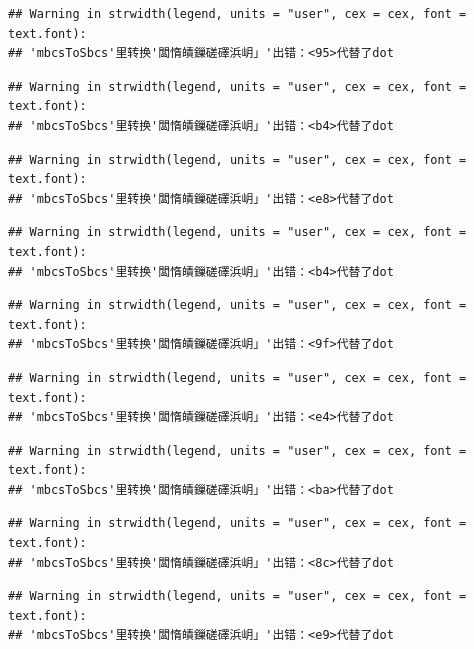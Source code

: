 \documentclass[
]{book}
\begin{document}
\begin{verbatim}
## Warning in strwidth(legend, units = "user", cex = cex, font = text.font):
## 'mbcsToSbcs'里转换'闆惰皟鏁磋礋浜岄」'出错：<95>代替了dot
\end{verbatim}

\begin{verbatim}
## Warning in strwidth(legend, units = "user", cex = cex, font = text.font):
## 'mbcsToSbcs'里转换'闆惰皟鏁磋礋浜岄」'出错：<b4>代替了dot
\end{verbatim}

\begin{verbatim}
## Warning in strwidth(legend, units = "user", cex = cex, font = text.font):
## 'mbcsToSbcs'里转换'闆惰皟鏁磋礋浜岄」'出错：<e8>代替了dot
\end{verbatim}

\begin{verbatim}
## Warning in strwidth(legend, units = "user", cex = cex, font = text.font):
## 'mbcsToSbcs'里转换'闆惰皟鏁磋礋浜岄」'出错：<b4>代替了dot
\end{verbatim}

\begin{verbatim}
## Warning in strwidth(legend, units = "user", cex = cex, font = text.font):
## 'mbcsToSbcs'里转换'闆惰皟鏁磋礋浜岄」'出错：<9f>代替了dot
\end{verbatim}

\begin{verbatim}
## Warning in strwidth(legend, units = "user", cex = cex, font = text.font):
## 'mbcsToSbcs'里转换'闆惰皟鏁磋礋浜岄」'出错：<e4>代替了dot
\end{verbatim}

\begin{verbatim}
## Warning in strwidth(legend, units = "user", cex = cex, font = text.font):
## 'mbcsToSbcs'里转换'闆惰皟鏁磋礋浜岄」'出错：<ba>代替了dot
\end{verbatim}

\begin{verbatim}
## Warning in strwidth(legend, units = "user", cex = cex, font = text.font):
## 'mbcsToSbcs'里转换'闆惰皟鏁磋礋浜岄」'出错：<8c>代替了dot
\end{verbatim}

\begin{verbatim}
## Warning in strwidth(legend, units = "user", cex = cex, font = text.font):
## 'mbcsToSbcs'里转换'闆惰皟鏁磋礋浜岄」'出错：<e9>代替了dot
\end{verbatim}
\end{document}
